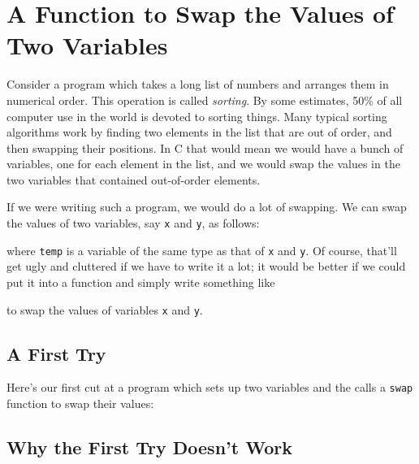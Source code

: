 %
%
%

\section{A Function to Swap the Values of Two Variables}

    Consider a program which takes a long list of numbers and arranges
them in numerical order.  This operation is called {\em sorting}\/.  By
some estimates, 50\% of all computer use in the world is devoted to
sorting things.  Many typical sorting algorithms work by finding two
elements in the list that are out of order, and then swapping their
positions.  In C that would mean we would have a bunch of variables, one
for each element in the list, and we would swap the values in the two
variables that contained out-of-order elements.

    If we were writing such a program, we would do a lot of swapping.
We can swap the values of two variables, say {\tt x} and {\tt y}, as
follows:

\begin{flushleft}
\verb% temp = x; %
\verb% x = y; %
\verb% y = temp; %
\end{flushleft}

\noindent where {\tt temp} is a variable of the same type as that of
{\tt x} and {\tt y}.  Of course, that'll get ugly and cluttered if we
have to write it a lot; it would be better if we could put it into a
function and simply write something like

\begin{flushleft}
\verb% swap(x,y); %
\end{flushleft}

\noindent to swap the values of variables {\tt x} and {\tt y}.  

\subsection{A First Try}

Here's our first cut at a program which sets up two variables and the
calls a {\tt swap} function to swap their values:



\subsection{Why the First Try Doesn't Work}

